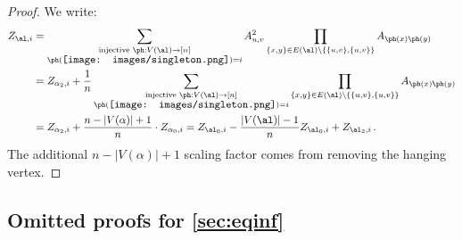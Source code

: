 \documentclass[12pt]{article}
\newcommand{\smallrootpic}{\vcenter{\hbox{\texttt{[image: images/singleton.png]}}}}
\begin{document}
\begin{proof}
    We write:
    \begin{align*}
        Z_{\al,i} &= \sum_{\substack{\text{injective }\ph: V(\al) \to [n]\\\ph(\smallrootpic) = i}} A_{u,v}^2\prod_{\{x,y\} \in E(\al) \setminus \{\{u,v\},\{u,v\}\}} A_{\ph(x)\ph(y)}\\
        &= Z_{\alpha_2,i} + \frac 1 n \sum_{\substack{\text{injective }\ph: V(\al) \to [n]\\\ph(\smallrootpic) = i}} \prod_{\{x,y\} \in E(\al) \setminus \{\{u,v\},\{u,v\}\}} A_{\ph(x)\ph(y)}\\
        &= Z_{\alpha_2,i} + \frac {n-|V(\alpha)|+1} n \cdot Z_{\alpha_0,i} = Z_{\al_0, i} - \frac{|V(\al)| - 1}{n}Z_{\al_0, i} + Z_{\al_2,i}\,.
    \end{align*}
    The additional $n-|V(\alpha)|+1$ scaling factor comes from removing the hanging vertex.
\end{proof}


\subsection{Omitted proofs for \texorpdfstring{\cref{sec:eqinf}}{Section~\ref{sec:eqinf}}}
\label{sec:omitted-combneg}
\end{document}
